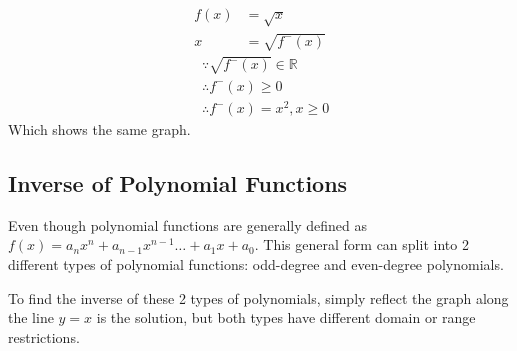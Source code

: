 \documentclass[12pt, titlepage]{article}
\begin{document}
        \begin{align}
            f(x)&=\sqrt{x}\\
            x&=\sqrt{f^-(x)}
        \end{align}
        \begin{align*}
             &\because \sqrt{f^-(x)} \in \mathbb{R}\\
             &\therefore f^-(x)\geq0\\
             &\therefore f^-(x)=x^2, x\geq0
        \end{align*}
        Which shows the same graph.
    
    \subsection{Inverse of Polynomial Functions}
        Even though polynomial functions are generally defined as $f(x)=a_nx^n+a_{n-1}x^{n-1}\ldots+a_1x+a_0$. This general form can split into 2 different types of polynomial functions: odd-degree and even-degree polynomials.

        To find the inverse of these 2 types of polynomials, simply reflect the graph along the line $y=x$ is the solution, but both types have different domain or range restrictions. 
        
\end{document}
